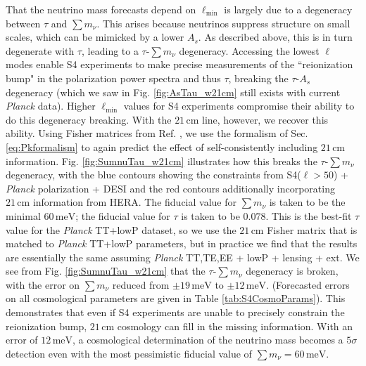 \documentclass[twocolumn,aps,prd,nofootinbib,showpacs,superscriptaddress]{revtex4-1}
\begin{document}
That the neutrino mass forecasts depend on $\ell_\textrm{min}$ is largely due to a degeneracy between $\tau$ and $\sum m_\nu$. This arises because neutrinos suppress structure on small scales, which can be mimicked by a lower $A_s$. As described above, this is in turn degenerate with $\tau$, leading to a $\tau$-$\sum m_\nu$ degeneracy. Accessing the lowest $\ell$ modes enable S4 experiments to make precise measurements of the ``reionization bump" in the polarization power spectra and thus $\tau$, breaking the $\tau$-$A_s$ degeneracy (which we saw in Fig. \ref{fig:AsTau_w21cm} still exists with current \emph{Planck} data). Higher $\ell_\textrm{min}$ values for S4 experiments compromise their ability to do this degeneracy breaking. With the $21\,\textrm{cm}$ line, however, we recover this ability. Using Fisher matrices from Ref. \cite{allison_et_al2015}, we use the formalism of Sec. \ref{eq:Pkformalism} to again predict the effect of self-consistently including $21\,\textrm{cm}$ information. Fig. \ref{fig:SumnuTau_w21cm} illustrates how this breaks the $\tau$-$\sum m_\nu$ degeneracy, with the blue contours showing the constraints from S4($\ell > 50$) + \emph{Planck} polarization + DESI and the red contours additionally incorporating $21\,\textrm{cm}$ information from HERA. The fiducial value for $\sum m_\nu$ is taken to be the minimal $60\,\textrm{meV}$; the fiducial value for $\tau$ is taken to be $0.078$. This is the best-fit $\tau$ value for the \emph{Planck} TT+lowP dataset, so we use the $21\,\textrm{cm}$ Fisher matrix that is matched to \emph{Planck} TT+lowP parameters, but in practice we find that the results are essentially the same assuming \emph{Planck} TT,TE,EE + lowP + lensing + ext. We see from Fig. \ref{fig:SumnuTau_w21cm} that the $\tau$-$\sum m_\nu$ degeneracy is broken, with the error on 
$\sum m_\nu$ reduced from $\pm 19 \,\textrm{meV}$ to $\pm 12 \,\textrm{meV}$. (Forecasted errors on all cosmological parameters are given in Table \ref{tab:S4CosmoParams}). This demonstrates that even if S4 experiments are unable to precisely constrain the reionization bump, $21\,\textrm{cm}$ cosmology can fill in the missing information. With an error of $12 \,\textrm{meV}$, a cosmological determination of the neutrino mass becomes a $5\sigma$ detection even with the most pessimistic fiducial value of $\sum m_\nu = 60\,\textrm{meV}$.
\end{document}
